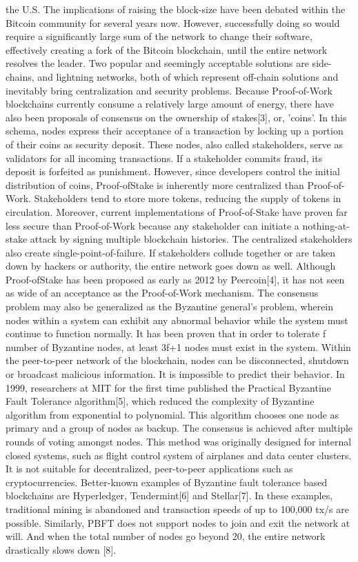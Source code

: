 the U.S. The implications of raising the block-size have been debated within the Bitcoin
community for several years now. However, successfully doing so would require a
significantly large sum of the network to change their software, effectively creating a fork of
the Bitcoin blockchain, until the entire network resolves the leader. Two popular and
seemingly acceptable solutions are side-chains, and lightning networks, both of which
represent off-chain solutions and inevitably bring centralization and security problems.
Because Proof-of-Work blockchains currently consume a relatively large amount of
energy, there have also been proposals of consensus on the ownership of stakes[3], or, 'coins'.
In this schema, nodes express their acceptance of a transaction by locking up a portion of
their coins as security deposit. These nodes, also called stakeholders, serve as validators for
all incoming transactions. If a stakeholder commits fraud, its deposit is forfeited as
punishment. However, since developers control the initial distribution of coins, Proof-ofStake
is inherently more centralized than Proof-of-Work. Stakeholders tend to store more
tokens, reducing the supply of tokens in circulation. Moreover, current implementations of 
Proof-of-Stake have proven far less secure than Proof-of-Work because any stakeholder can
initiate a nothing-at-stake attack by signing multiple blockchain histories. The centralized
stakeholders also create single-point-of-failure. If stakeholders collude together or are taken
down by hackers or authority, the entire network goes down as well. Although Proof-ofStake
has been proposed as early as 2012 by Peercoin[4], it has not seen as wide of an
acceptance as the Proof-of-Work mechanism.
The consensus problem may also be generalized as the Byzantine general’s problem,
wherein nodes within a system can exhibit any abnormal behavior while the system must
continue to function normally. It has been proven that in order to tolerate f number of
Byzantine nodes, at least 3f+1 nodes must exist in the system. Within the peer-to-peer
network of the blockchain, nodes can be disconnected, shutdown or broadcast malicious
information. It is impossible to predict their behavior. In 1999, researchers at MIT for the
first time published the Practical Byzantine Fault Tolerance algorithm[5], which reduced the
complexity of Byzantine algorithm from exponential to polynomial. This algorithm chooses
one node as primary and a group of nodes as backup. The consensus is achieved after
multiple rounds of voting amongst nodes. This method was originally designed for internal
closed systems, such as flight control system of airplanes and data center clusters. It is not
suitable for decentralized, peer-to-peer applications such as cryptocurrencies. Better-known
examples of Byzantine fault tolerance based blockchains are Hyperledger, Tendermint[6]
and Stellar[7]. In these examples, traditional mining is abandoned and transaction speeds of
up to 100,000 tx/s are possible. Similarly, PBFT does not support nodes to join and exit the
network at will. And when the total number of nodes go beyond 20, the entire network
drastically slows down [8]. 
